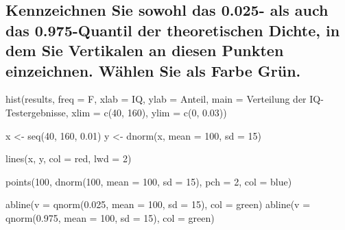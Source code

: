 \documentclass[12pt,a4paper]{article}
\newenvironment{Shaded}{\begin{snugshade}}{\end{snugshade}}
\newcommand{\AttributeTok}[1]{\textcolor[rgb]{0.77,0.63,0.00}{#1}}
\newcommand{\DecValTok}[1]{\textcolor[rgb]{0.00,0.00,0.81}{#1}}
\newcommand{\FloatTok}[1]{\textcolor[rgb]{0.00,0.00,0.81}{#1}}
\newcommand{\FunctionTok}[1]{\textcolor[rgb]{0.00,0.00,0.00}{#1}}
\newcommand{\NormalTok}[1]{#1}
\newcommand{\OtherTok}[1]{\textcolor[rgb]{0.56,0.35,0.01}{#1}}
\newcommand{\StringTok}[1]{\textcolor[rgb]{0.31,0.60,0.02}{#1}}
\begin{document}
\hypertarget{kennzeichnen-sie-sowohl-das-0.025--als-auch-das-0.975-quantil-der-theoretischen-dichte-in-dem-sie-vertikalen-an-diesen-punkten-einzeichnen.-wuxe4hlen-sie-als-farbe-gruxfcn.}{%
\subsection{Kennzeichnen Sie sowohl das 0.025- als auch das
0.975-Quantil der theoretischen Dichte, in dem Sie Vertikalen an diesen
Punkten einzeichnen. Wählen Sie als Farbe
Grün.}\label{kennzeichnen-sie-sowohl-das-0.025--als-auch-das-0.975-quantil-der-theoretischen-dichte-in-dem-sie-vertikalen-an-diesen-punkten-einzeichnen.-wuxe4hlen-sie-als-farbe-gruxfcn.}}

\begin{Shaded}
\begin{Highlighting}[]
    \FunctionTok{hist}\NormalTok{(results, }
         \AttributeTok{freq =}\NormalTok{ F, }
         \AttributeTok{xlab =} \StringTok{\textquotesingle{}IQ\textquotesingle{}}\NormalTok{, }
         \AttributeTok{ylab =} \StringTok{\textquotesingle{}Anteil\textquotesingle{}}\NormalTok{, }
         \AttributeTok{main =} \StringTok{\textquotesingle{}Verteilung der IQ{-}Testergebnisse\textquotesingle{}}\NormalTok{, }
         \AttributeTok{xlim =} \FunctionTok{c}\NormalTok{(}\DecValTok{40}\NormalTok{, }\DecValTok{160}\NormalTok{), }
         \AttributeTok{ylim =} \FunctionTok{c}\NormalTok{(}\DecValTok{0}\NormalTok{, }\FloatTok{0.03}\NormalTok{))}
    
\NormalTok{    x }\OtherTok{\textless{}{-}} \FunctionTok{seq}\NormalTok{(}\DecValTok{40}\NormalTok{, }\DecValTok{160}\NormalTok{, }\FloatTok{0.01}\NormalTok{)}
\NormalTok{    y }\OtherTok{\textless{}{-}} \FunctionTok{dnorm}\NormalTok{(x, }\AttributeTok{mean =} \DecValTok{100}\NormalTok{, }\AttributeTok{sd =} \DecValTok{15}\NormalTok{)}
    
    \FunctionTok{lines}\NormalTok{(x, y, }\AttributeTok{col =} \StringTok{\textquotesingle{}red\textquotesingle{}}\NormalTok{, }\AttributeTok{lwd =} \DecValTok{2}\NormalTok{)}
    
    \FunctionTok{points}\NormalTok{(}\DecValTok{100}\NormalTok{, }
           \FunctionTok{dnorm}\NormalTok{(}\DecValTok{100}\NormalTok{, }\AttributeTok{mean =} \DecValTok{100}\NormalTok{, }\AttributeTok{sd =} \DecValTok{15}\NormalTok{), }
           \AttributeTok{pch =} \DecValTok{2}\NormalTok{, }
           \AttributeTok{col =} \StringTok{\textquotesingle{}blue\textquotesingle{}}\NormalTok{)}
    
    \FunctionTok{abline}\NormalTok{(}\AttributeTok{v =} \FunctionTok{qnorm}\NormalTok{(}\FloatTok{0.025}\NormalTok{, }\AttributeTok{mean =} \DecValTok{100}\NormalTok{, }\AttributeTok{sd =} \DecValTok{15}\NormalTok{), }\AttributeTok{col =} \StringTok{\textquotesingle{}green\textquotesingle{}}\NormalTok{)}
    \FunctionTok{abline}\NormalTok{(}\AttributeTok{v =} \FunctionTok{qnorm}\NormalTok{(}\FloatTok{0.975}\NormalTok{, }\AttributeTok{mean =} \DecValTok{100}\NormalTok{, }\AttributeTok{sd =} \DecValTok{15}\NormalTok{), }\AttributeTok{col =} \StringTok{\textquotesingle{}green\textquotesingle{}}\NormalTok{)}
\end{Highlighting}
\end{Shaded}
\end{document}
